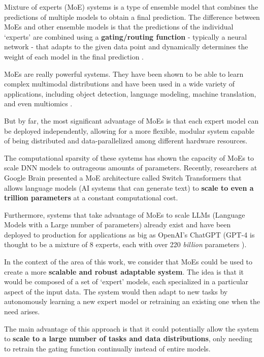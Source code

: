 \documentclass[../main.tex]{subfiles}
\begin{document}
    Mixture of experts (MoE) systems is a type of ensemble model that combines the predictions of multiple models to obtain a final prediction. The difference between MoEs and other ensemble models is that the predictions of the individual `experts' are combined using a \textbf{gating/routing function} - typically a neural network - that adapts to the given data point and dynamically determines the weight of each model in the final prediction \cite{chen_towards_2022}.

    MoEs are really powerful systems. They have been shown to be able to learn complex multimodal distributions and have been used in a wide variety of applications, including object detection, language modeling, machine translation, and even multiomics \cite{hwang_tutel_2023,mustafa_multimodal_2022,shazeer_outrageously_2017, minoura_scmm_2021}.
    
    But by far, the most significant advantage of MoEs is that each expert model can be deployed independently, allowing for a more flexible, modular system capable of being distributed and data-parallelized among different hardware resources. 

    The computational sparsity of these systems has shown the capacity of MoEs to scale DNN models to outrageous amounts of parameters. Recently, researchers at Google Brain presented a MoE architecture called Switch Transformers \cite{fedusSwitchTransformersScaling2022a} that allows language models (AI systems that can generate text) to \textbf{scale to even a trillion parameters} at a constant computational cost.
    
    Furthermore, systems that take advantage of MoEs to scale LLMs (Language Models with a Large number of parameters) already exist and have been deployed to production for applications as big as OpenAI's ChatGPT (GPT-4 is thought to be a mixture of 8 experts, each with over 220 \textit{billion} parameters \cite{rickardMixtureExpertsGPT42023}).
    
    In the context of the area of this work, we consider that MoEs could be used to create a more \textbf{scalable and robust adaptable system}. The idea is that it would be composed of a set of `expert' models, each specialized in a particular aspect of the input data. The system would then adapt to new tasks by autonomously learning a new expert model or retraining an existing one when the need arises.
    
    The main advantage of this approach is that it could potentially allow the system to \textbf{scale to a large number of tasks and data distributions}, only needing to retrain the gating function continually instead of entire models. 
    
\end{document}
